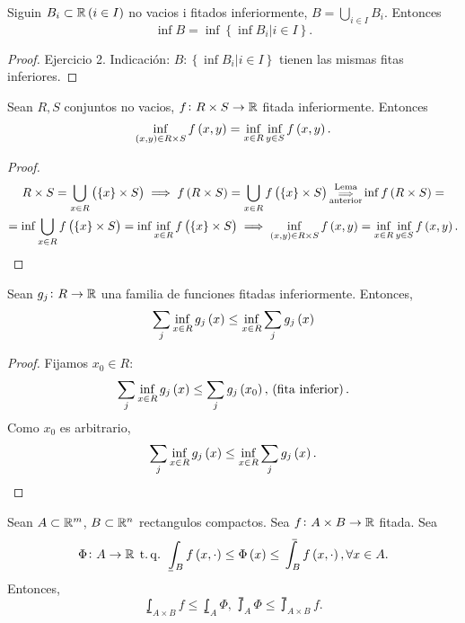 \begin{lema*}
    Siguin $B_i \subset \mathbb{R} \left( i\in I\right)$ no vacios i fitados inferiormente, $B = \bigcup_{i\in I} B_i$. Entonces
    \[ \inf B = \inf\left\{\inf B_i | i\in I\right\}.\]
\end{lema*}
\begin{proof}
    Ejercicio 2. Indicación: $B \colon \left\{ \inf B_i | i\in I\right\}$ tienen las mismas fitas inferiores.
\end{proof}
\begin{lema}
    Sean $R, S$ conjuntos no vacios, $f \colon R\times S \to \mathbb{R}$ fitada inferiormente. Entonces
    \[ \inf_{\left( x,y\right)\in R\times S} f\left( x,y\right) = \inf_{x\in R}\inf_{y\in S} f\left( x,y\right). \]
\end{lema}
\begin{proof}
    \begin{gather*}
        R\times S = \bigcup_{x\in R} \left( \left\{x\right\}\times S\right) \implies f\left( R\times S\right) = \bigcup_{x\in R} f\left(\left\{ x\right\} \times S\right) \substack{\text{Lema}\\ \implies\\ \text{anterior}} \inf f\left( R\times S \right) = \\ = \inf \bigcup_{x\in R} f\left( \left\{x\right\} \times S\right) = \inf \inf_{x\in R} f\left( \left\{x\right\} \times S\right) \implies \inf_{\left( x,y\right) \in R\times S} f\left( x,y\right) = \inf_{x\in R} \inf_{y\in S} f\left( x,y\right).
    \end{gather*}
\end{proof}
\begin{lema}
    Sean $g_j \colon R \to \mathbb{R}$ una familia de funciones fitadas inferiormente. Entonces,
    \[ \sum_j \inf_{x\in R} g_j\left( x\right) \leq \inf_{x\in R} \sum_j g_j\left( x\right) \]
\end{lema}
\begin{proof}
    Fijamos $x_0 \in R:$
    \[ \sum_j \inf_{x\in R} g_j\left( x\right) \leq \sum_j g_j \left( x_0\right), \,\left(\text{fita inferior}\right). \]
    Como $x_0$ es arbitrario,
    \[ \sum_j \inf_{x\in R} g_j\left( x\right) \leq \inf_{x\in R} \sum_j g_j\left( x\right). \]
\end{proof}
\begin{lema}
    Sean $A \subset \mathbb{R}^m$, $B \subset \mathbb{R}^n$ rectangulos compactos. Sea $f \colon A\times B\to\mathbb{R}$ fitada. Sea
    \[ \Phi \colon A\to\real \tq \lowint_B f\lp x,\cdot\rp\leq\Phi\lp x\rp\leq\upint_B f\lp x,\cdot\rp, \forall x\in A. \]
    Entonces,
    \[ \lowint_{A\times B} f \leq \lowint_A \Phi, \, \upint_A \Phi \leq \upint_{A\times B} f. \]
\end{lema}
